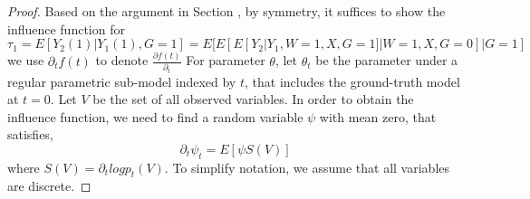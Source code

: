 \documentclass{article}
\begin{document}
\begin{proof}
    Based on the argument in Section \qu , by symmetry, it suffices to show the influence function  for$\tau_1 = E[ Y_2(1) | Y_1(1) , G=1] = E[ E[E [ Y_2 | Y_1 ,W=1,X, G=1] | W=1, X, G=0 ] | G=1]$
    we use $ \partial_t f(t) $ to denote $\frac{ \partial f(t) }{ \partial_t } $ For parameter $\theta $, let $ \theta_t $ be the parameter under a regular parametric sub-model indexed by $t$, that includes the ground-truth model at $t=0$.
    Let $V$ be the set of all observed variables. In order to obtain the influence function, we need to find a random variable $\psi $ with mean zero, that satisfies, 
    \begin{equation}
        \partial_t \psi_t = E [ \psi S(V) ]
    \end{equation}
    where $ S(V) = \partial_t log p_t (V) $.
    To simplify notation, we assume that all variables are discrete. 


\end{proof}
\end{document}
